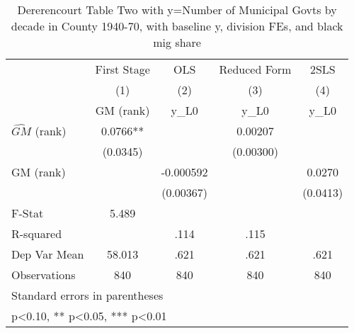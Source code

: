\begin{table}[htbp]\centering
\def\sym#1{\ifmmode^{#1}\else\(^{#1}\)\fi}
\caption{Dererencourt Table Two with y=Number of Municipal Govts by decade in County 1940-70, with baseline y, division FEs, and black mig share}
\begin{tabular}{l*{4}{c}}
\toprule
                    & First Stage   &         OLS   &Reduced Form   &        2SLS   \\
                    &\multicolumn{1}{c}{(1)}&\multicolumn{1}{c}{(2)}&\multicolumn{1}{c}{(3)}&\multicolumn{1}{c}{(4)}\\
                    &\multicolumn{1}{c}{GM  (rank)}&\multicolumn{1}{c}{y\_L0}&\multicolumn{1}{c}{y\_L0}&\multicolumn{1}{c}{y\_L0}\\
\midrule
$\hat{GM}$ (rank)   &      0.0766** &               &     0.00207   &               \\
                    &    (0.0345)   &               &   (0.00300)   &               \\
\addlinespace
GM  (rank)          &               &   -0.000592   &               &      0.0270   \\
                    &               &   (0.00367)   &               &    (0.0413)   \\
\midrule
F-Stat              &       5.489   &               &               &               \\
R-squared           &               &        .114   &        .115   &               \\
Dep Var Mean        &      58.013   &        .621   &        .621   &        .621   \\
Observations        &         840   &         840   &         840   &         840   \\
\bottomrule
\multicolumn{5}{l}{\footnotesize Standard errors in parentheses}\\
\multicolumn{5}{l}{\footnotesize * p<0.10, ** p<0.05, *** p<0.01}\\
\end{tabular}
\end{table}
